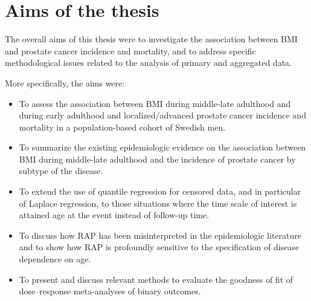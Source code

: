 %

\chapter{Aims of the thesis}

The overall aims of this thesis were to investigate the association between BMI and prostate cancer incidence and mortality, and to address specific methodological issues related to the analysis of primary and aggregated data.

\bigskip

 More specifically, the aims were:

\begin{itemize}
\item To assess the association between BMI during middle-late adulthood and during early adulthood and localized/advanced prostate cancer incidence and mortality in a population-based cohort of Swedish men.

\item To summarize the existing epidemiologic evidence on the association between BMI during middle-late adulthood and the incidence of prostate cancer by subtype of the disease. 

\item To extend the use of  quantile regression for censored data, and in particular of Laplace regression,  to those situations where the time scale of interest is attained age at the event instead of follow-up time.

\item To discuss how RAP has been misinterpreted in the epidemiologic literature and to show how RAP is profoundly sensitive to the specification of disease dependence on age.

\item To present and discuss relevant methods to evaluate the goodness of fit of dose--response meta-analyses of binary outcomes. 
\end{itemize}
